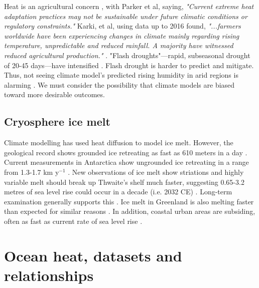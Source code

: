 \documentclass{article}
\begin{document}
Heat is an agricultural concern  \cite{Parker2020FoodSecurityClimate,MariemPlants2021CO2-starch-nutrition-stress}, with Parker et al, saying, \emph{"Current extreme heat adaptation practices may not be sustainable under future climatic conditions or regulatory constraints."} Karki, et al, using data up to 2016 found, \emph{"...farmers worldwide have been experiencing changes in climate mainly regarding rising temperature, unpredictable and reduced rainfall. A majority have witnessed reduced agricultural production."} \cite{Karki2020Farmersclimate}. "Flash droughts"---rapid, subseasonal drought of 20-45 days---have intensified \cite{Yuan2023FlashDroughtsClimateChange}. Flash drought is harder to predict and mitigate. Thus, not seeing climate model's predicted rising humidity in arid regions is alarming \cite{Simpson2024ObservedHumidityInDryRegionsContradictClimateModels}. We must consider the possibility that climate models are biased toward more desirable outcomes.

\subsection{Cryosphere ice melt}
\label{lb:CryosphereIceMelt}
Climate modelling has used heat diffusion to model ice melt. However, the geological record shows grounded ice retreating as fast as 610 meters in a day \cite{Batchelor2023RapidIcdRetreatHundredsMetres}. Current measurements in Antarctica show ungrounded ice retreating in a range from 1.3-1.7 km y$^{-1}$ \cite{Milillo2022RapidGlacierRetreat}.  New observations of ice melt show striations and highly variable melt should break up Thwaite's shelf much faster, suggesting 0.65-3.2 metres of sea level rise could occur in a decade (i.e. 2032 CE) \cite{Pettit2021ThwaitesEasternCollapse, Fox2022TheComingCollapseSciAm}. Long-term examination generally supports this \cite{Domgaard2025HalfCenturyOfDynamicInstabilityFollowingTheOcean-drivenBreak-upOfWordieIceShelf}. Ice melt in Greenland is also melting faster than expected for similar reasons \cite{Schulz2022ImprovedMeltRate}. In addition, coastal urban areas are subsiding, often as fast as current rate of sea level rise \cite{Ohenhen2024DisappearingCitiesOnUScoasts}. 

\section{Ocean heat, datasets and relationships}
\end{document}
